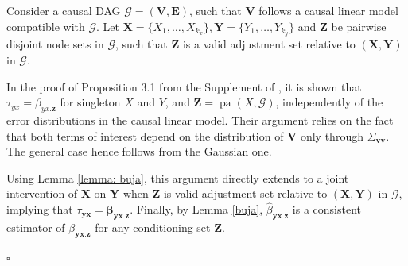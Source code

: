 \documentclass[11pt,a4paper]{article}
\theoremstyle{definition}
\theoremstyle{remark}
\newenvironment{proofof}[1][]{\begin{trivlist}
\item[\hskip \labelsep {\textit{Proof of #1.}}]}{\hfill{}$\square$\end{trivlist}}
\DeclareMathOperator{\pa}{pa}
\newcommand{\g}[1][G]{\mathcal{#1}}
\begin{document}
\begin{proofof}[Proposition~\ref{avarDAG}]
	
	Consider a causal DAG $\g=(\mathbf{V},\mathbf{E})$, such that $\mathbf{V}$ follows a causal linear model compatible with $\g$. Let $\mathbf{X}=\{X_1,\dots,X_{k_x}\},\mathbf{Y}=\{Y_1,\dots,Y_{k_y}\}$ and $\mathbf{Z}$ be pairwise disjoint node sets in $\g$, such that $\mathbf{Z}$ is a valid adjustment set relative to $(\mathbf{X},\mathbf{Y})$ in $\g$.
	
	
	
	
	In the proof of Proposition 3.1 from the Supplement of \citet{nandy2017estimating}, it is shown that $\tau_{yx}=\beta_{yx.\mathbf{z}}$ for singleton $X$ and $Y$, and $\mathbf{Z}=\pa(X,\g)$, independently of the error distributions in the causal linear model. Their argument relies on the fact that both terms of interest depend on the distribution of $\mathbf{V}$ only through $\Sigma_{\mathbf{vv}}$. The general case hence follows from the Gaussian one.
	
	Using Lemma \ref{lemma: buja}, this argument directly extends to a joint intervention of $\mathbf{X}$ on $\mathbf{Y}$ when $\mathbf{Z}$ is valid adjustment set relative to $(\mathbf{X},\mathbf{Y})$ in $\g$, implying  that  $\tau_{\mathbf{yx}} = \boldsymbol{\beta}_{\mathbf{yx}.\mathbf{z}}$.
	Finally, by Lemma \ref{buja}, $\hat{\beta}_{\mathbf{yx}.\mathbf{z}}$ is a consistent estimator of $\beta_{\mathbf{yx}.\mathbf{z}}$ for any conditioning set $\mathbf{Z}$.
	

\end{proofof}
\end{document}
